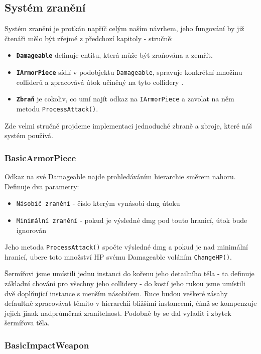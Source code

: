 \subsection{Systém zranění}

Systém zranění je protkán napříč celým naším návrhem, jeho fungování by již čtenáři mělo být zřejmé z předchozí kapitoly - stručně: 
\begin{itemize}
  \item \textbf{\texttt{Damageable}} definuje entitu, která může být zraňována a zemřít.
  \item \textbf{\texttt{IArmorPiece}} sídlí v podobjektu \texttt{Damageable}, spravuje konkrétní množinu colliderů a zpracovává útok učiněný na tyto collidery .
  \item \textbf{\texttt{Zbraň}} je cokoliv, co umí najít odkaz na \texttt{IArmorPiece} a zavolat na něm metodu \texttt{ProcessAttack()}.
\end{itemize}
Zde velmi stručně projdeme implementaci jednoduché zbraně a zbroje, které náš systém používá.

\subsubsection*{BasicArmorPiece}

Odkaz na své Damageable najde prohledáváním hierarchie směrem nahoru. Definuje dva parametry:
\begin{itemize}
  \item \texttt{Násobič zranění} - číslo kterým vynásobí dmg útoku  
  \item \texttt{Minimální zranění} - pokud je výsledné dmg pod touto hranicí, útok bude ignorován
\end{itemize}

Jeho metoda \texttt{ProcessAttack()} spočte výsledné dmg a pokud je nad minimální hranicí, ubere toto množství HP svému Damageable voláním \texttt{ChangeHP()}.

Šermířovi jsme umístili jednu instanci do kořenu jeho detailního těla - ta definuje základní chování pro všechny jeho collidery - do kostí jeho rukou jsme umístili dvě doplňující instance s menším násobičem. Ruce budou veškeré zásahy defaultně zpracovávat těmito v hierarchii bližšími instancemi, čímž se kompenzuje jejich jinak nadprůměrná zranitelnost. Podobně by se dal vyladit i zbytek šermířova těla.

\subsubsection*{BasicImpactWeapon}


